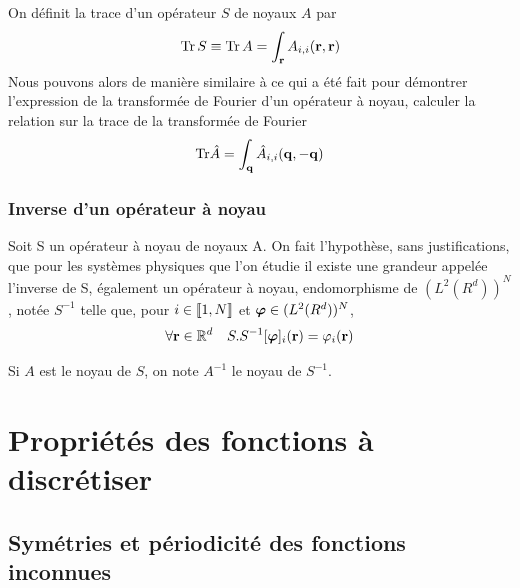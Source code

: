 \documentclass[10pt]{article}
\begin{document}
\begin{multicols}{2}
On définit la trace d'un opérateur $S$ de noyaux $A$ par
\begin{equation}
  \text{Tr}\, S \equiv \text{Tr} \, A = \int_{{\bf r}} A_{i,i}({\bf r},{\bf r}) 
\end{equation}
Nous pouvons alors de manière similaire à ce qui a été fait pour démontrer l'expression de la transformée de Fourier d'un opérateur à noyau, calculer la relation sur la trace de la transformée de Fourier
\begin{equation}
  \text{Tr} \hat{A} =  \int_{{\bf q}} \hat{A}_{i,i}({\bf q},-{\bf q}) 
 \end{equation}



\vspace*{11pt}



\subsubsection{Inverse d'un opérateur à noyau}

Soit S un opérateur à noyau de noyaux A. On fait l'hypothèse, sans justifications, que pour les systèmes physiques que l'on étudie il existe une grandeur appelée l'inverse de S, également un opérateur à noyau, endomorphisme de $(L^2(R^d))^N$, notée $S^{-1}$ telle que, pour $i \in  \llbracket 1,N \rrbracket $ et $\boldsymbol{ \varphi} \in (L^2(R^d))^N$, 
\begin{equation}
	\forall {\bf r} \in \mathbb{R}^d \quad S.S^{-1}[\boldsymbol{ \varphi}]_i({\bf r}) = \varphi_i ({\bf r})	
\end{equation}

Si $A$ est le noyau de $S$, on note $A^{-1}$ le noyau de $S^{-1}$.

\end{multicols}



\pagebreak



\section{Propriétés des fonctions à discrétiser}



\subsection{Symétries et périodicité des fonctions inconnues}
\end{document}

